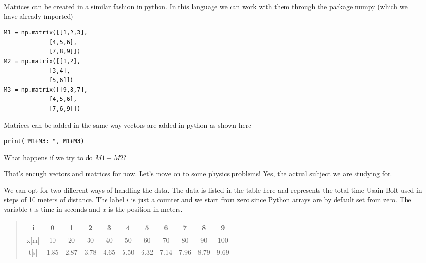 \documentclass[%
oneside,                 %
final,                   %
10pt]{article}
\begin{document}
Matrices can be created in a similar fashion in python.  In this
language we can work with them through the package numpy (which we
have already imported)











\begin{verbatim}
M1 = np.matrix([[1,2,3],
             [4,5,6],
             [7,8,9]])
M2 = np.matrix([[1,2],
             [3,4],
             [5,6]])
M3 = np.matrix([[9,8,7],
             [4,5,6],
             [7,6,9]])

\end{verbatim}


Matrices can be added in the same way vectors are added in python as shown here


\begin{verbatim}
print("M1+M3: ", M1+M3)

\end{verbatim}

What happens if we try to do $M1+M2$?

That's enough vectors and matrices for now. Let's move on to some physics problems! Yes, the actual subject we are studying for. 

We can opt for two different ways of handling the data. The data is listed in the table here and represents the total time Usain Bolt used in steps of  10 meters of distance. The label $i$ is just a counter and we start from zero since Python arrays are by default set from zero. The variable $t$ is time in seconds and $x$ is the position in meters.


\begin{quote}
\begin{tabular}{ccccccccccc}
\hline
\multicolumn{1}{c}{ i } & \multicolumn{1}{c}{ 0 } & \multicolumn{1}{c}{ 1 } & \multicolumn{1}{c}{ 2 } & \multicolumn{1}{c}{ 3 } & \multicolumn{1}{c}{ 4 } & \multicolumn{1}{c}{ 5 } & \multicolumn{1}{c}{ 6 } & \multicolumn{1}{c}{ 7 } & \multicolumn{1}{c}{ 8 } & \multicolumn{1}{c}{ 9 } \\
\hline
x[m] & 10   & 20   & 30   & 40   & 50   & 60   & 70   & 80   & 90   & 100  \\
\hline
t[s] & 1.85 & 2.87 & 3.78 & 4.65 & 5.50 & 6.32 & 7.14 & 7.96 & 8.79 & 9.69 \\
\hline
\end{tabular}
\end{quote}
\end{document}

